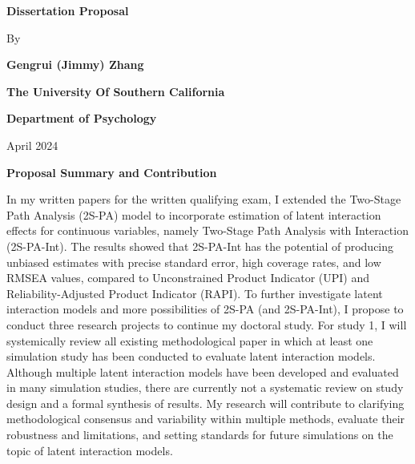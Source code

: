 \documentclass[
  11pt,
  man]{apa6}
\author{\phantom{0}}
\date{}
\affiliation{\phantom{0}}
\begin{document}
\allsectionsfont{\centering}
\subsectionfont{\raggedright}
\subsubsectionfont{\raggedright}


\begin{centering}

\vspace*{6cm}

\Large

\doublespacing
{\bf Dissertation Proposal}

\vspace{1 cm}

\normalsize
\singlespacing
By

\vspace{0.5 cm}

\Large

{\bf Gengrui (Jimmy) Zhang}

\vspace{1.5 cm}

\normalsize 
{\bf The University Of Southern California}

\normalsize 
{\bf Department of Psychology}

\vspace{1.5 cm}

\normalsize
April 2024

\end{centering}

\newpage


\begin{centering}

\Large
{\bf Proposal Summary and Contribution}

\end{centering}


In my written papers for the written qualifying exam, I extended the Two-Stage Path Analysis (2S-PA) model to incorporate estimation of latent interaction effects for continuous variables, namely Two-Stage Path Analysis with Interaction (2S-PA-Int). The results showed that 2S-PA-Int has the potential of producing unbiased estimates with precise standard error, high coverage rates, and low RMSEA values, compared to Unconstrained Product Indicator (UPI) and Reliability-Adjusted Product Indicator (RAPI). To further investigate latent interaction models and more possibilities of 2S-PA (and 2S-PA-Int), I propose to conduct three research projects to continue my doctoral study.
For study 1, I will systemically review all existing methodological paper in which at least one simulation study has been conducted to evaluate latent interaction models. Although multiple latent interaction models have been developed and evaluated in many simulation studies, there are currently not a systematic review on study design and a formal synthesis of results. My research will contribute to clarifying methodological consensus and variability within multiple methods, evaluate their robustness and limitations, and setting standards for future simulations on the topic of latent interaction models.
\end{document}
